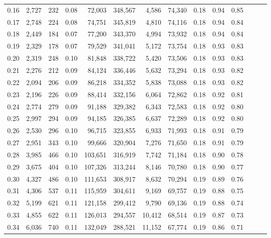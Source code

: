 \begin{tabular}{rrrrrrrrrrrrrr}
0.16 &  2,727 &    232 &  0.08 &   72,003 &  348,567 &   4,586 &  74,340 &  0.18 &  0.94 &      0.85 \\
0.17 &  2,748 &    224 &  0.08 &   74,751 &  345,819 &   4,810 &  74,116 &  0.18 &  0.94 &      0.84 \\
0.18 &  2,449 &    184 &  0.07 &   77,200 &  343,370 &   4,994 &  73,932 &  0.18 &  0.94 &      0.84 \\
0.19 &  2,329 &    178 &  0.07 &   79,529 &  341,041 &   5,172 &  73,754 &  0.18 &  0.93 &      0.83 \\
0.20 &  2,319 &    248 &  0.10 &   81,848 &  338,722 &   5,420 &  73,506 &  0.18 &  0.93 &      0.83 \\
0.21 &  2,276 &    212 &  0.09 &   84,124 &  336,446 &   5,632 &  73,294 &  0.18 &  0.93 &      0.82 \\
0.22 &  2,094 &    206 &  0.09 &   86,218 &  334,352 &   5,838 &  73,088 &  0.18 &  0.93 &      0.82 \\
0.23 &  2,196 &    226 &  0.09 &   88,414 &  332,156 &   6,064 &  72,862 &  0.18 &  0.92 &      0.81 \\
0.24 &  2,774 &    279 &  0.09 &   91,188 &  329,382 &   6,343 &  72,583 &  0.18 &  0.92 &      0.80 \\
0.25 &  2,997 &    294 &  0.09 &   94,185 &  326,385 &   6,637 &  72,289 &  0.18 &  0.92 &      0.80 \\
0.26 &  2,530 &    296 &  0.10 &   96,715 &  323,855 &   6,933 &  71,993 &  0.18 &  0.91 &      0.79 \\
0.27 &  2,951 &    343 &  0.10 &   99,666 &  320,904 &   7,276 &  71,650 &  0.18 &  0.91 &      0.79 \\
0.28 &  3,985 &    466 &  0.10 &  103,651 &  316,919 &   7,742 &  71,184 &  0.18 &  0.90 &      0.78 \\
0.29 &  3,675 &    404 &  0.10 &  107,326 &  313,244 &   8,146 &  70,780 &  0.18 &  0.90 &      0.77 \\
0.30 &  4,327 &    486 &  0.10 &  111,653 &  308,917 &   8,632 &  70,294 &  0.19 &  0.89 &      0.76 \\
0.31 &  4,306 &    537 &  0.11 &  115,959 &  304,611 &   9,169 &  69,757 &  0.19 &  0.88 &      0.75 \\
0.32 &  5,199 &    621 &  0.11 &  121,158 &  299,412 &   9,790 &  69,136 &  0.19 &  0.88 &      0.74 \\
0.33 &  4,855 &    622 &  0.11 &  126,013 &  294,557 &  10,412 &  68,514 &  0.19 &  0.87 &      0.73 \\
0.34 &  6,036 &    740 &  0.11 &  132,049 &  288,521 &  11,152 &  67,774 &  0.19 &  0.86 &      0.71 \\

\end{tabular}
